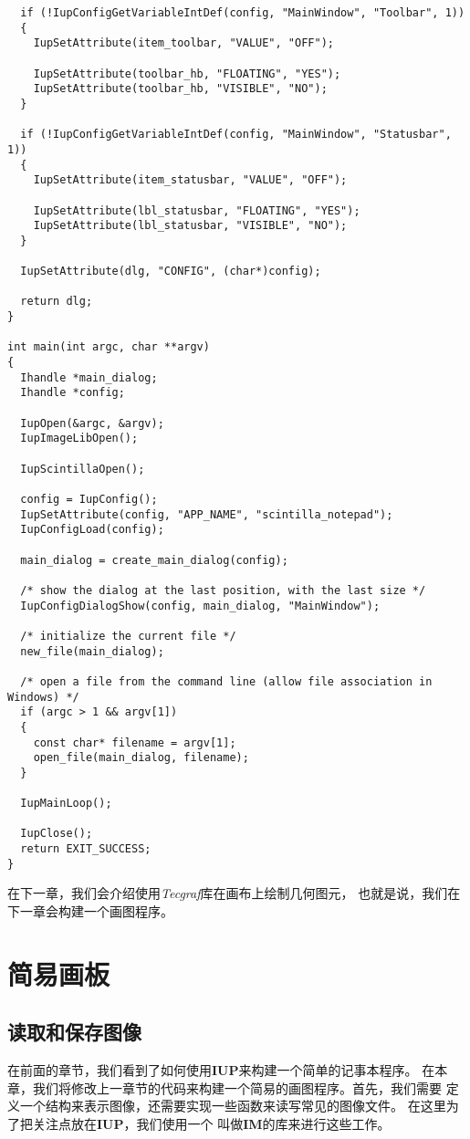 \documentclass{ctexart}
\begin{document}
\begin{lstlisting}
  if (!IupConfigGetVariableIntDef(config, "MainWindow", "Toolbar", 1))
  {
    IupSetAttribute(item_toolbar, "VALUE", "OFF");

    IupSetAttribute(toolbar_hb, "FLOATING", "YES");
    IupSetAttribute(toolbar_hb, "VISIBLE", "NO");
  }

  if (!IupConfigGetVariableIntDef(config, "MainWindow", "Statusbar", 1))
  {
    IupSetAttribute(item_statusbar, "VALUE", "OFF");

    IupSetAttribute(lbl_statusbar, "FLOATING", "YES");
    IupSetAttribute(lbl_statusbar, "VISIBLE", "NO");
  }

  IupSetAttribute(dlg, "CONFIG", (char*)config);

  return dlg;
}

int main(int argc, char **argv)
{
  Ihandle *main_dialog;
  Ihandle *config;

  IupOpen(&argc, &argv);
  IupImageLibOpen();

  IupScintillaOpen();

  config = IupConfig();
  IupSetAttribute(config, "APP_NAME", "scintilla_notepad");
  IupConfigLoad(config);

  main_dialog = create_main_dialog(config);

  /* show the dialog at the last position, with the last size */
  IupConfigDialogShow(config, main_dialog, "MainWindow");

  /* initialize the current file */
  new_file(main_dialog);

  /* open a file from the command line (allow file association in Windows) */
  if (argc > 1 && argv[1])
  {
    const char* filename = argv[1];
    open_file(main_dialog, filename);
  }

  IupMainLoop();

  IupClose();
  return EXIT_SUCCESS;
}
\end{lstlisting}

在下一章，我们会介绍使用\emph{Tecgraf}库在画布上绘制几何图元，
也就是说，我们在下一章会构建一个画图程序。

\section{简易画板}

\subsection{读取和保存图像}

在前面的章节，我们看到了如何使用\textbf{IUP}来构建一个简单的记事本程序。
在本章，我们将修改上一章节的代码来构建一个简易的画图程序。首先，我们需要
定义一个结构来表示图像，还需要实现一些函数来读写常见的图像文件。
在这里为了把关注点放在\textbf{IUP}，我们使用一个
叫做\textbf{IM}的库来进行这些工作。
\end{document}
